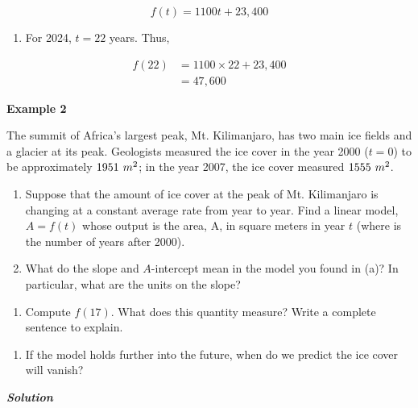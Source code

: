 \documentclass[
  letterpaper,
  DIV=11,
  numbers=noendperiod]{scrreprt}
\providecommand{\tightlist}{%
  \setlength{\itemsep}{0pt}\setlength{\parskip}{0pt}}\usepackage{longtable,booktabs,array}
\begin{document}
\[f(t) = 1100t+23,400\]

\begin{enumerate}
\def\labelenumi{\alph{enumi})}
\setcounter{enumi}{2}
\tightlist
\item
  For 2024, \(t=22\) years. Thus,
\end{enumerate}

\begin{align}
f(22) &= 1100\times22+23,400\\&=47,600
\end{align}

\textbf{Example 2}

The summit of Africa's largest peak, Mt. Kilimanjaro, has two main ice
fields and a glacier at its peak. Geologists measured the ice cover in
the year 2000 (\(t = 0\)) to be approximately \(1951\hspace{.05in}m^2\);
in the year 2007, the ice cover measured \(1555 \hspace{.05in}m^2\).

\begin{enumerate}
\def\labelenumi{\alph{enumi})}
\item
  Suppose that the amount of ice cover at the peak of Mt. Kilimanjaro is
  changing at a constant average rate from year to year. Find a linear
  model, \(A=f(t)\) whose output is the area, A, in square meters in
  year \(t\) (where is the number of years after 2000).
\item
  What do the slope and \(A\)-intercept mean in the model you found in
  (a)? In particular, what are the units on the slope?
\end{enumerate}

\begin{enumerate}
\def\labelenumi{\Alph{enumi})}
\setcounter{enumi}{2}
\tightlist
\item
  Compute \(f(17)\). What does this quantity measure? Write a complete
  sentence to explain.
\end{enumerate}

\begin{enumerate}
\def\labelenumi{\alph{enumi})}
\setcounter{enumi}{3}
\tightlist
\item
  If the model holds further into the future, when do we predict the ice
  cover will vanish?
\end{enumerate}

\textbf{\emph{Solution}}
\end{document}
